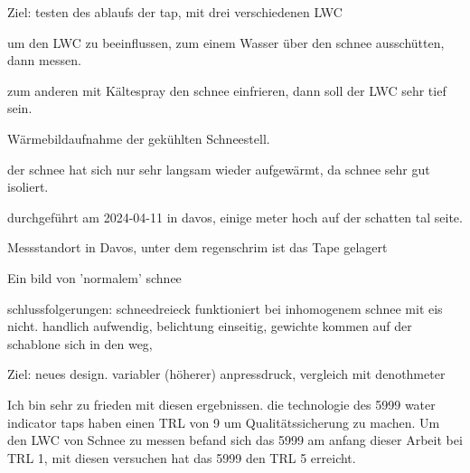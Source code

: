 \label{ErstFeldVer}
Ziel: testen des ablaufs der tap, mit drei verschiedenen LWC

um den LWC zu beeinflussen, zum einem Wasser über den schnee ausschütten, dann messen.

zum anderen mit Kältespray den schnee einfrieren, dann soll der LWC sehr tief sein. \caption{Wärmebildaufnahme der gekühlten Schneestell. }

der schnee hat sich nur sehr langsam wieder aufgewärmt, da schnee sehr gut isoliert.

durchgeführt am 2024-04-11 in davos, einige meter hoch auf der schatten tal seite.
\caption{Messstandort in Davos, unter dem regenschrim ist das Tape gelagert} 

\caption{Ein bild von 'normalem' schnee}

schlussfolgerungen: schneedreieck funktioniert bei inhomogenem schnee mit eis nicht.
handlich aufwendig, belichtung einseitig, gewichte kommen auf der schablone sich in den weg,

\label{ZweiFeldVer}
Ziel: neues design. variabler (höherer) anpressdruck, vergleich mit denothmeter

Ich bin sehr zu frieden mit diesen ergebnissen. die technologie des 5999 water indicator taps haben einen TRL von 9 um Qualitätssicherung zu machen. Um den LWC von Schnee zu messen befand sich das 5999 am anfang dieser Arbeit bei TRL 1, mit diesen versuchen hat das 5999 den TRL 5 erreicht.
